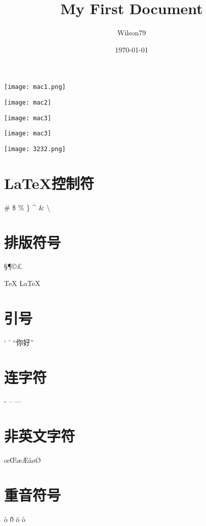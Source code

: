 \documentclass{article}
\title{My First Document}
\author{Wilson79}
\date{\today}
\begin{document}
 
	\tableofcontents %
	\maketitle %

	\texttt{[image: mac1.png]} 

	\texttt{[image: mac2]}
	
	\texttt{[image: mac3]}

	\texttt{[image: mac3]} 


	\texttt{[image: 3232.png]} 

	
	\section{LaTeX控制符} 
	\# \$ \% \} \^{}  \& \textbackslash %

	\section{排版符号} 
	\S \P \dag \ddag \copyright \pounds

	\TeX{} \LaTeX{} \LaTeXe{} %

	\section{引号}
	` ' ``你好'' %
	\section{连字符} %
	- -- ---
	\section{非英文字符} 
	\oe \OE \ae \AE \aa \o \O
	\section{重音符号} %
	\`o \^0 \u{o} \r{o}
\end{document}

